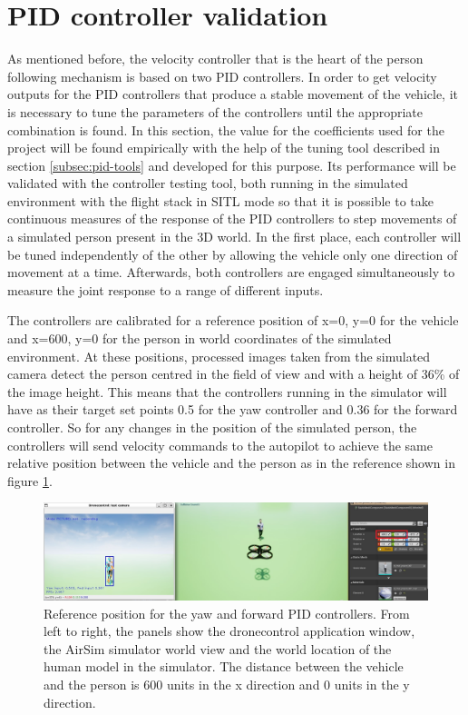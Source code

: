 
\clearpage

\section{PID controller validation}
\label{sec:test-1-pid}


As mentioned before, the velocity controller that is the heart of the person following mechanism is based on two PID controllers.
In order to get velocity outputs for the PID controllers that produce a stable movement of the vehicle, it is necessary to tune the parameters of the controllers until the appropriate combination is found.
In this section, the value for the coefficients used for the project will be found empirically with the help of the tuning tool described in section \ref{subsec:pid-tools} and developed for this purpose. Its performance will be validated with the controller testing tool, both running in the simulated environment with the flight stack in SITL mode so that it is possible to take continuous measures of the response of the PID controllers to step movements of a simulated person present in the 3D world.
In the first place, each controller will be tuned independently of the other by allowing the vehicle only one direction of movement at a time.
Afterwards, both controllers are engaged simultaneously to measure the joint response to a range of different inputs.

The controllers are calibrated for a reference position of x=0, y=0 for the vehicle and x=600, y=0 for the person in world coordinates of the simulated environment.
At these positions, processed images taken from the simulated camera detect the person centred in the field of view and with a height of 36\% of the image height.
This means that the controllers running in the simulator will have as their target set points 0.5 for the yaw controller and 0.36 for the forward controller. 
So for any changes in the position of the simulated person, the controllers will send velocity commands to the autopilot to achieve the same relative position between the vehicle and the person as in the reference shown in figure \ref{fig:tune-start-pos}.

\begin{figure}
  \centering
  \includegraphics[width=\textwidth, keepaspectratio]{img/pid/tune-ref-pos.jpg}
  \caption{Reference position for the yaw and forward PID controllers. From left to right, the panels show the dronecontrol application window, the AirSim simulator world view and the world location of the human model in the simulator. The distance between the vehicle and the person is 600 units in the x direction and 0 units in the y direction.}
  \label{fig:tune-start-pos}
\end{figure}


